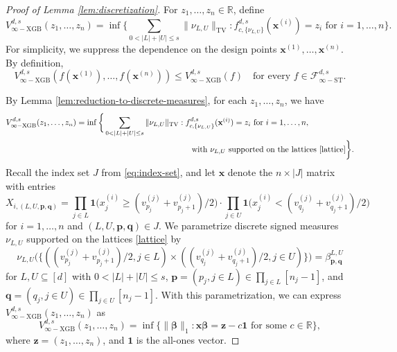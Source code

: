 \documentclass[10pt]{article}
\newcommand{\R}{{\mathbb R}}
\newcommand{\fstinf}{{\mathcal{F}^{d, s}_{\infty-\text{ST}}}}
\newcommand{\vinfxgb}{{V^{d, s}_{\infty-\text{XGB}}}}
\newcommand{\fcnu}{{f^{d, s}_{c, \{\nu_{L, U}\}}}}
\newcommand{\xbf}{{\mathbf{x}}}
\newcommand{\pbf}{{\mathbf{p}}}
\newcommand{\qbf}{{\mathbf{q}}}
\newcommand{\zbf}{{\mathbf{z}}}
\newcommand{\betabf}{{\boldsymbol{\beta}}}
\newcommand{\onevec}{{\mathbf{1}}}
\newcommand{\ind}{{\mathbf{1}}}
\begin{document}
\begin{proof}[Proof of Lemma \ref{lem:discretization}]
For $z_1, \dots, z_n \in \R$, define 
\begin{equation*}
    \vinfxgb(z_1, \dots, z_n) = \inf \bigg\{ 
    \sum_{0 < |L| + |U| \le s} \|\nu_{L, U}\|_{\text{TV}}: 
    \fcnu(\xbf^{(i)}) 
    = z_i \text{ for } i = 1, \dots, n \bigg\}.
\end{equation*}
For simplicity, we suppress the dependence on the design points 
$\xbf^{(1)}, \dots, \xbf^{(n)}$.
By definition,
\begin{equation*}
    \vinfxgb(f(\xbf^{(1)}), \dots, f(\xbf^{(n)})) 
    \le \vinfxgb(f) \quad \text{for every } f \in \fstinf.
\end{equation*}

By Lemma \ref{lem:reduction-to-discrete-measures}, for each 
$z_1, \dots, z_n$, we have
\begin{equation*}
\begin{aligned}
    \vinfxgb(z_1, \dots, z_n) &= \inf \bigg\{ 
    \sum_{0 < |L| + |U| \le s} \|\nu_{L, U}\|_{\text{TV}}: 
    \fcnu(\xbf^{(i)}) 
    = z_i \text{ for } i = 1, \dots, n, \\
    &\qquad \qquad \qquad \qquad \qquad \qquad \qquad 
    \text{ with } \nu_{L, U} 
    \text{ supported on the lattices \eqref{lattice}}\bigg\}.
\end{aligned}
\end{equation*}
Recall the index set $J$ from \eqref{eq:index-set}, and let $\xbf$ 
denote the $n \times |J|$ matrix with entries
\begin{equation*}
    X_{i, (L, U, \pbf, \qbf)} 
    = \prod_{j \in L} 
    \ind\big(x^{(i)}_j \ge (v^{(j)}_{p_j} + v^{(j)}_{p_j + 1})/2\big)
    \cdot \prod_{j \in U} 
    \ind\big(x^{(i)}_j < (v^{(j)}_{q_j} + v^{(j)}_{q_j + 1})/2\big)
\end{equation*}
for $i = 1, \dots, n$ and $(L, U, \pbf, \qbf) \in J$.
We parametrize discrete signed measures $\nu_{L, U}$ 
supported on the lattices \eqref{lattice} by 
\begin{equation}\label{eq:measures-discrete-parametrization}
    \nu_{L, U} 
    \big(\{((v^{(j)}_{p_j} + v^{(j)}_{p_j + 1})/2, j \in L) 
    \times ((v^{(j)}_{q_j} + v^{(j)}_{q_j + 1})/2, j \in U)\}\big)
    = \beta^{L, U}_{\pbf, \qbf}
\end{equation}
for $L, U \subseteq [d]$ with $0 < |L| + |U| \le s$, 
$\pbf = (p_j, j \in L) \in \prod_{j \in L} [n_j - 1]$, 
and $\qbf = (q_j, j \in U) \in \prod_{j \in U} [n_j - 1]$.
With this parametrization, we can express $\vinfxgb(z_1, \dots, z_n)$ as 
\begin{equation}\label{eq:discrete-complexity}
    \vinfxgb(z_1, \dots, z_n) = \inf \big\{\|\betabf\|_1: \xbf \betabf 
    = \zbf - c \onevec \text{ for some } c \in \R\big\},
\end{equation}
where $\zbf = (z_1, \dots, z_n)$, and $\onevec$ is the all-ones 
vector.


\end{proof}
\end{document}
